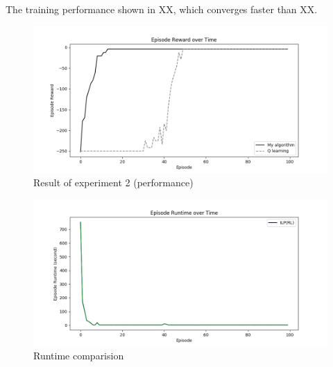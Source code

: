 The training performance shown in XX, which converges faster than XX.

\begin{figure}[!htb]
\centering
\includegraphics[width=1.0\textwidth]{./figures/experiment2_test}
\caption{Result of experiment 2 (performance)}
\label{experiment2_test}
\end{figure}

\begin{figure}[!htb]
\centering
\includegraphics[width=1.0\textwidth]{./figures/experiment2_runtime}
\caption{Runtime comparision}
\label{experiment1}
\end{figure}
    

